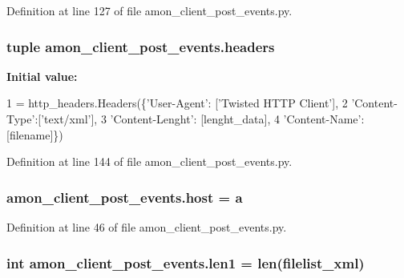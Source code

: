 Definition at line 127 of file amon\-\_\-client\-\_\-post\-\_\-events.\-py.

\hypertarget{namespaceamon__client__post__events_afa009b881ab85a1384666c2f7a2463ac}{
\subsubsection[{headers}]{\setlength{\rightskip}{0pt plus 5cm}tuple amon\-\_\-client\-\_\-post\-\_\-events.\-headers}}\label{namespaceamon__client__post__events_afa009b881ab85a1384666c2f7a2463ac}
{\bfseries Initial value\-:}
\begin{DoxyCode}
1 = http\_headers.Headers(\{\textcolor{stringliteral}{'User-Agent'}: [\textcolor{stringliteral}{'Twisted HTTP Client'}],
2                                             \textcolor{stringliteral}{'Content-Type'}:[\textcolor{stringliteral}{'text/xml'}], 
3                                             \textcolor{stringliteral}{'Content-Lenght'}: [lenght\_data],
4                                             \textcolor{stringliteral}{'Content-Name'}:[filename]\})
\end{DoxyCode}


Definition at line 144 of file amon\-\_\-client\-\_\-post\-\_\-events.\-py.

\hypertarget{namespaceamon__client__post__events_a1c1848cdc573caaba7d46953a60f44d4}{
\subsubsection[{host}]{\setlength{\rightskip}{0pt plus 5cm}amon\-\_\-client\-\_\-post\-\_\-events.\-host = a}}\label{namespaceamon__client__post__events_a1c1848cdc573caaba7d46953a60f44d4}


Definition at line 46 of file amon\-\_\-client\-\_\-post\-\_\-events.\-py.

\hypertarget{namespaceamon__client__post__events_a4d19062ba6a7999d70e77b4be1893e26}{
\subsubsection[{len1}]{\setlength{\rightskip}{0pt plus 5cm}int amon\-\_\-client\-\_\-post\-\_\-events.\-len1 = len({\bf filelist\-\_\-xml})}}\label{namespaceamon__client__post__events_a4d19062ba6a7999d70e77b4be1893e26}


